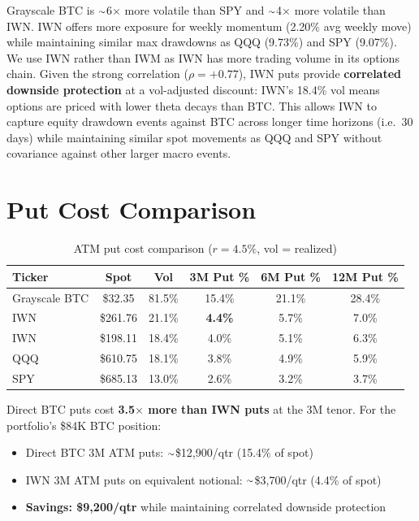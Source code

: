 \documentclass[11pt,letterpaper]{article}
\begin{document}
Grayscale BTC is ${\raise.17ex\hbox{$\scriptstyle\sim$}}$6$\times$ more
volatile than SPY and ${\raise.17ex\hbox{$\scriptstyle\sim$}}$4$\times$ more
volatile than IWN. IWN offers more exposure for weekly momentum (2.20\% avg
weekly move) while maintaining similar max drawdowns as QQQ (9.73\%) and SPY
(9.07\%). We use IWN rather than IWM as IWN has more trading volume in its
options chain. Given the strong correlation ($\rho = +0.77$), IWN puts
provide \textbf{correlated downside protection} at a vol-adjusted discount:
IWN's 18.4\% vol means options are priced with lower theta decays than BTC.
This allows IWN to capture equity drawdown events against BTC across longer
time horizons (i.e.\ 30 days) while maintaining similar spot movements as
QQQ and SPY without covariance against other larger macro events.

\section{Put Cost Comparison}

\begin{table}[H]
\centering
\caption{ATM put cost comparison ($r=4.5\%$, vol = realized)}
\begin{tabular}{lccccc}
\toprule
Ticker & Spot & Vol & 3M Put \% & 6M Put \% & 12M Put \% \\
\midrule
\textcolor{loss}{Grayscale BTC} & \$32.35 & \textcolor{loss}{81.5\%} & \textcolor{loss}{15.4\%} & \textcolor{loss}{21.1\%} & \textcolor{loss}{28.4\%} \\
IWN & \$261.76 & 21.1\% & \textbf{4.4\%} & 5.7\% & 7.0\% \\
IWN & \$198.11 & 18.4\% & 4.0\% & 5.1\% & 6.3\% \\
QQQ & \$610.75 & 18.1\% & 3.8\% & 4.9\% & 5.9\% \\
SPY & \$685.13 & 13.0\% & 2.6\% & 3.2\% & 3.7\% \\
\bottomrule
\end{tabular}
\end{table}

Direct BTC puts cost \textbf{3.5$\times$ more than IWN puts} at the 3M
tenor. For the portfolio's \$84K BTC position:

\medskip
\begin{itemize}[itemsep=4pt]
  \item Direct BTC 3M ATM puts: ${\raise.17ex\hbox{$\scriptstyle\sim$}}$\$12,900/qtr
        (15.4\% of spot)
  \item IWN 3M ATM puts on equivalent notional: ${\raise.17ex\hbox{$\scriptstyle\sim$}}$\$3,700/qtr
        (4.4\% of spot)
  \item \textbf{Savings: \$9,200/qtr} while maintaining correlated
        downside protection
\end{itemize}
\end{document}
